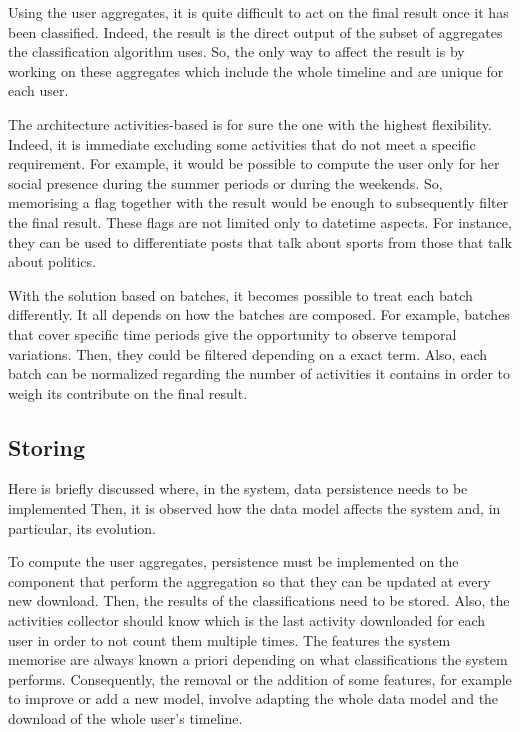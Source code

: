 Using the user aggregates, it is quite difficult to act on the final result once it has been classified.
Indeed, the result is the direct output of the subset of aggregates the classification algorithm uses. So, the only way to affect the result is by working on these aggregates which include the whole timeline and are unique for each user.

The architecture activities-based is for sure the one with the highest flexibility. Indeed, it is immediate excluding some activities that do not meet a specific requirement.
For example, it would be possible to compute the user only for her social presence during the summer periods or during the weekends. 
So, memorising a flag together with the result would be enough to subsequently filter the final result.
These flags are not limited only to datetime aspects. For instance, they can be used to differentiate posts that talk about sports from those that talk about politics.

With the solution based on batches, it becomes possible to treat each batch differently. It all depends on how the batches are composed.
For example, batches that cover specific time periods give the opportunity to observe temporal variations. Then, they could be filtered depending on a exact term.
Also, each batch can be normalized regarding the number of activities it contains in order to weigh its contribute on the final result.


\subsection{Storing}
Here is briefly discussed where, in the system, data persistence needs to be implemented
Then, it is observed how the data model affects the system and, in particular, its evolution.

To compute the user aggregates, persistence must be implemented on the component that perform the aggregation so that they can be updated at every new download.
Then, the results of the classifications need to be stored. Also, the activities collector should know which is the last activity downloaded for each user in order to not count them multiple times.
The features the system memorise are always known a priori depending on what classifications the system performs. Consequently, the removal or the addition of some features, for example to improve or add a new model, involve adapting the whole data model and the download of the whole user's timeline.

